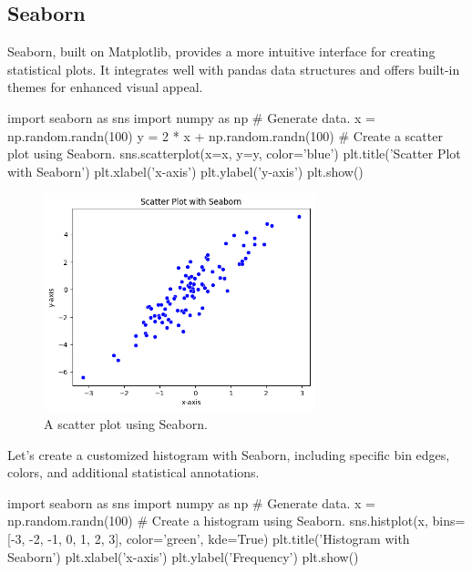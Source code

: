 \subsection{Seaborn}

Seaborn, built on Matplotlib, provides a more intuitive interface for creating statistical plots. It
integrates well with pandas data structures and offers built-in themes for enhanced visual appeal.

\begin{codeblock}[language=python]
    import seaborn as sns
    import numpy as np
    # Generate data.
    x = np.random.randn(100)
    y = 2 * x + np.random.randn(100)
    # Create a scatter plot using Seaborn.
    sns.scatterplot(x=x, y=y, color='blue')
    plt.title('Scatter Plot with Seaborn')
    plt.xlabel('x-axis')
    plt.ylabel('y-axis')
    plt.show()
\end{codeblock}

\begin{figure}[H]
    \centering
    \includegraphics[width=0.7\textwidth]{assets/fig3_mpl.png}
    \caption{A scatter plot using Seaborn.}
\end{figure}

Let's create a customized histogram with Seaborn, including specific bin edges, colors, and
additional statistical annotations.

\begin{codeblock}[language=python]
    import seaborn as sns
    import numpy as np
    # Generate data.
    x = np.random.randn(100)
    # Create a histogram using Seaborn.
    sns.histplot(x, bins=[-3, -2, -1, 0, 1, 2, 3], color='green', kde=True)
    plt.title('Histogram with Seaborn')
    plt.xlabel('x-axis')
    plt.ylabel('Frequency')
    plt.show()
\end{codeblock}

